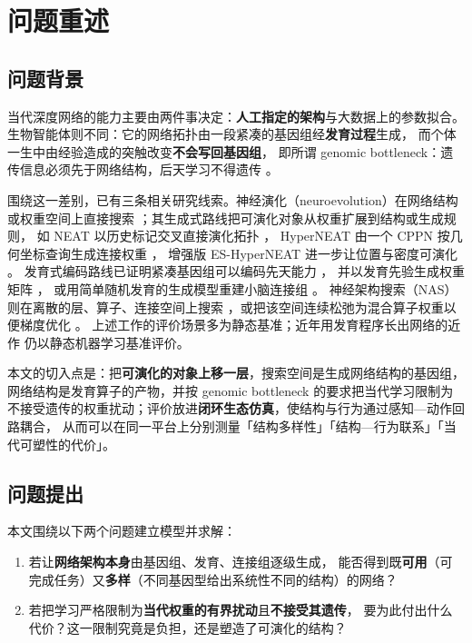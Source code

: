\section{问题重述}\label{sec:problem}

\subsection{问题背景}

当代深度网络的能力主要由两件事决定：\textbf{人工指定的架构}与大数据上的参数拟合。
生物智能体则不同：它的网络拓扑由一段紧凑的基因组经\textbf{发育过程}生成，
而个体一生中由经验造成的突触改变\textbf{不会写回基因组}，
即所谓 genomic bottleneck：遗传信息必须先于网络结构，后天学习不得遗传
\citep{bib1_zador2019,bib2_barabasi2023,bib3_shuvaev2024}。

围绕这一差别，已有三条相关研究线索。神经演化（neuroevolution）在网络结构或权重空间上直接搜索
\citep{bib5_miikkulainen2025}；其生成式路线把可演化对象从权重扩展到结构或生成规则，
如 NEAT 以历史标记交叉直接演化拓扑 \citep{bib222_stanley2002}，
HyperNEAT 由一个 CPPN 按几何坐标查询生成连接权重 \citep{bib223_stanley2009}，
增强版 ES-HyperNEAT 进一步让位置与密度可演化 \citep{bib124_risi2012}。
发育式编码路线已证明紧凑基因组可以编码先天能力 \citep{bib1_zador2019,bib3_shuvaev2024}，
并以发育先验生成权重矩阵 \citep{bib2_barabasi2023}，
或用简单随机发育的生成模型重建小脑连接组 \citep{bib4_richter2025}。
神经架构搜索（NAS）则在离散的层、算子、连接空间上搜索
\citep{bib224_elsken2019}，或把该空间连续松弛为混合算子权重以便梯度优化 \citep{bib225_liu2019}。
上述工作的评价场景多为静态基准；近年用发育程序长出网络的近作
\citep{bib226_najarro2023} 仍以静态机器学习基准评价。

本文的切入点是：把\textbf{可演化的对象上移一层}，搜索空间是生成网络结构的基因组，
网络结构是发育算子的产物，并按 genomic bottleneck 的要求把当代学习限制为
不接受遗传的权重扰动；评价放进\textbf{闭环生态仿真}，使结构与行为通过感知—动作回路耦合，
从而可以在同一平台上分别测量「结构多样性」「结构—行为联系」「当代可塑性的代价」。

\subsection{问题提出}

本文围绕以下两个问题建立模型并求解：

\begin{enumerate}
  \item 若让\textbf{网络架构本身}由基因组、发育、连接组逐级生成，
        能否得到既\textbf{可用}（可完成任务）又\textbf{多样}（不同基因型给出系统性不同的结构）的网络？
  \item 若把学习严格限制为\textbf{当代权重的有界扰动}且\textbf{不接受其遗传}，
        要为此付出什么代价？这一限制究竟是负担，还是塑造了可演化的结构？
\end{enumerate}

